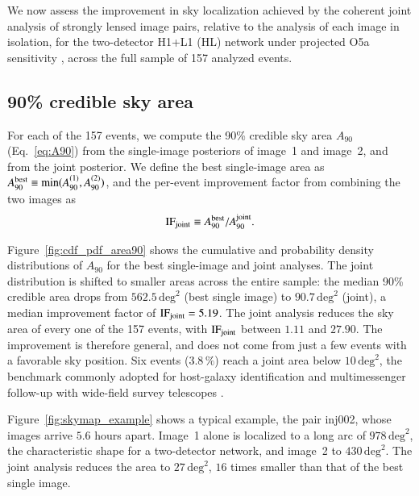 \documentclass{aa}
\begin{document}
We now assess the improvement in sky localization achieved by the coherent joint analysis of strongly lensed image pairs, relative to the analysis of each image in isolation, for the two-detector H1+L1 (HL) network under projected O5a sensitivity \citep{O5PSD}, across the full sample of 157 analyzed events.

\subsection{90\% credible sky area}
\label{sec:results_area90}

For each of the 157 events, we compute the 90\% credible sky area $A_{90}$
(Eq.~\eqref{eq:A90}) from the single-image posteriors of image~1 and
image~2, and from the joint posterior. We define the best single-image area
as $A_{90}^{\rm best} \equiv \min(A_{90}^{(1)}, A_{90}^{(2)})$, and the
per-event improvement factor from combining the two images as
\begin{equation}
    \mathrm{IF}_{\rm joint} \equiv A_{90}^{\rm best} / A_{90}^{\rm joint} .
    \label{eq:if_joint}
\end{equation}

Figure~\ref{fig:cdf_pdf_area90} shows the cumulative and probability density
distributions of $A_{90}$ for the best single-image and joint analyses. The
joint distribution is shifted to smaller areas across the entire sample: the
median 90\% credible area drops from $562.5\,\mathrm{deg}^2$ (best single image) to $90.7\,\mathrm{deg}^2$ (joint), a median improvement factor of
$\mathrm{IF}_{\rm joint} = 5.19$. The joint analysis reduces the sky area of every one of the 157 events, with $\mathrm{IF}_{\rm joint}$
between $1.11$ and $27.90$. The improvement is therefore general, and does
not come from just a few events with a favorable sky position. Six events ($3.8\,\%$) reach a joint area below
$10\,\mathrm{deg}^2$, the benchmark commonly adopted for host-galaxy
identification and multimessenger follow-up with wide-field survey
telescopes \citep{Abbott2020Prospects}.

Figure~\ref{fig:skymap_example} shows a typical example, the pair inj002,
whose images arrive $5.6$ hours apart. Image~1 alone is localized to a long
arc of $978\,\mathrm{deg}^2$, the characteristic shape for a two-detector
network, and image~2 to $430\,\mathrm{deg}^2$. The joint analysis reduces
the area to $27\,\mathrm{deg}^2$, $16$ times smaller than that of the best
single image.
\end{document}
